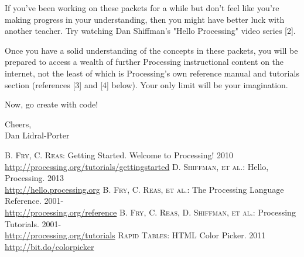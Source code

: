\documentclass[
]{leaflet}
\begin{document}
If you've been working on these packets for a while but don't feel like you're making progress in your understanding, then you might have better luck with another teacher.
Try watching Dan Shiffman's "Hello Processing" video series [2].

Once you have a solid understanding of the concepts in these packets, you will be prepared to access a wealth of further Processing instructional content on the internet, not the least of which is Processing's own reference manual and tutorials section (references [3] and [4] below).
Your only limit will be your imagination.

Now, go create with code!

Cheers,\\
Dan Lidral-Porter

\begin{thebibliography}{000}
  \textsc{B. Fry, C. Reas}: Getting Started. Welcome to Processing! 2010\\
  \url{http://processing.org/tutorials/gettingstarted}
  \textsc{D. Shiffman, et al.}: Hello, Processing. 2013\\
  \url{http://hello.processing.org}
  \textsc{B. Fry, C. Reas, et al.}: The Processing Language Reference. 2001-\\
  \url{http://processing.org/reference}
  \textsc{B. Fry, C. Reas, D. Shiffman, et al.}: Processing Tutorials. 2001-\\
  \url{http://processing.org/tutorials}
  \textsc{Rapid Tables}: HTML Color Picker. 2011\\
  \url{http://bit.do/colorpicker}
\end{thebibliography}

\loggingall
\end{document}
